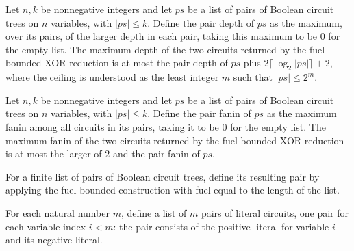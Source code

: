 \begin{theorem}
\label{BoolCircuit.xorFuel_depth}
\leanok
{}
Let $n,k$ be nonnegative integers and let $ps$ be a list of pairs of Boolean circuit
trees on $n$ variables, with $|ps|\le k$. Define the pair depth of $ps$ as the maximum,
over its pairs, of the larger depth in each pair, taking this maximum to be $0$ for the
empty list. The maximum depth of the two circuits returned by the fuel-bounded XOR
reduction is at most the pair depth of $ps$ plus $2\lceil\log_2 |ps|\rceil+2$, where the
ceiling is understood as the least integer $m$ such that $|ps|\le 2^m$.
\end{theorem}

\begin{theorem}
\label{BoolCircuit.xorFuel_fanin}
\leanok
{}
Let $n,k$ be nonnegative integers and let $ps$ be a list of pairs of Boolean circuit
trees on $n$ variables, with $|ps|\le k$. Define the pair fanin of $ps$ as the maximum
fanin among all circuits in its pairs, taking it to be $0$ for the empty list. The
maximum fanin of the two circuits returned by the fuel-bounded XOR reduction is at most
the larger of $2$ and the pair fanin of $ps$.
\end{theorem}

\begin{definition}
\label{BoolCircuit.xorTree}
\leanok
{}
For a finite list of pairs of Boolean circuit trees, define its resulting pair by
applying the fuel-bounded construction with fuel equal to the length of the list.
\end{definition}

\begin{definition}
\label{BoolCircuit.parityPairs}
\leanok
{}
For each natural number $m$, define a list of $m$ pairs of literal circuits, one pair
for each variable index $i<m$: the pair consists of the positive literal for variable
$i$ and its negative literal.
\end{definition}


